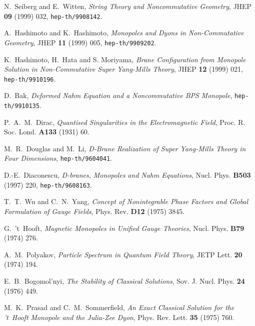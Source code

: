 \documentclass[a4paper,12pt]{article}
\begin{document}
\begin{thebibliography}{10}

 N.~Seiberg and E.~Witten, \textit{String Theory and
             Noncommutative Geometry}, JHEP {\bf 09} (1999) 032,
             \texttt{hep-th/9908142}.

 A.~Hashimoto and K.~Hashimoto, \textit{Monopoles and Dyons in
             Non-Commutative Geometry}, JHEP {\bf 11} (1999) 005,
             \texttt{hep-th/9909202}.

 K.~Hashimoto, H.~Hata and S. Moriyama, \textit{Brane 
             Conf\mbox{}iguration from Monopole Solution in Non-Commutative 
             Super Yang-Mills Theory}, JHEP {\bf 12} (1999) 021,
             \texttt{hep-th/9910196}.

 D.~Bak, \textit{Deformed Nahm Equation and a Noncommutative
             BPS Monopole}, \texttt{hep-th/9910135}.

 P.~A.~M.~Dirac, \textit{Quantised Singularities in the 
             Electromagnetic Field}, Proc. R. Soc. Lond. {\bf A133} (1931) 60.

 M.~R.~Douglas and M.~Li, \textit{D-Brane Realization of 
             \coordHE{} Super Yang-Mills Theory in Four Dimensions},
             \texttt{hep-th/9604041}.

 D.-E.~Diaconescu, \textit{D-branes, Monopoles and Nahm 
              Equations}, Nucl. Phys. {\bf B503} (1997) 220, 
              \texttt{hep-th/9608163}.

 T.~T.~Wu and C.~N.~Yang, \textit{Concept of Nonintegrable Phase
             Factors and Global Formulation of Gauge Fields}, Phys. Rev.
             {\bf D12} (1975) 3845. 

 G.~'t~Hooft, \textit{Magnetic Monopoles in Unif\mbox{}ied Gauge
             Theories}, Nucl. Phys. {\bf B79} (1974) 276.

 A.~M.~Polyakov, \textit{Particle Spectrum in Quantum Field
             Theory}, JETP Lett. {\bf 20} (1974) 194.

 E.~B.~Bogomol'nyi, \textit{The Stability of Classical Solutions},
             Sov. J. Nucl. Phys. {\bf 24} (1976) 449.

 M.~K.~Prasad and C.~M.~Sommerf\mbox{}ield, 
             \textit{An Exact Classical
             Solution for the 't~Hooft Monopole and the Julia-Zee Dyon},
             Phys. Rev. Lett. {\bf 35} (1975) 760. 


\end{thebibliography}
\end{document}
